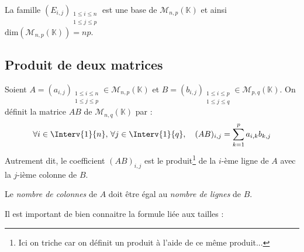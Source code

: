 \documentclass[a4paper,10pt]{report}
\begin{document}
\begin{prop} La famille $(E_{i,j})_{\substack{1 \leq i \leq n \\ 1 \leq j \leq p}}$ est une base de $\mathcal{M}_{n,p}(\mathbb{K})$ et ainsi $\textrm{dim}(\mathcal{M}_{n,p}(\mathbb{K}))=np$.
\end{prop}


\subsection{Produit de deux matrices}

\noindent Soient $A=(a_{i,j})_{\substack{1 \leq i \leq n \\ 1 \leq j \leq p}} \in \mathcal{M}_{n,p}(\mathbb{K})$ et $B=(b_{i,j})_{\substack{1 \leq i \leq p \\ 1 \leq j \leq q}} \in \mathcal{M}_{p,q}(\mathbb{K})$. On définit la matrice $AB$ de $\mathcal{M}_{n,q}(\mathbb{K})$ par :
$$ \forall i \in \Interv{1}{n}, \, \forall j \in \Interv{1}{q}, \quad (AB)_{i,j} = \sum_{k=1}^p a_{i,k} b_{k,j}$$
Autrement dit, le coefficient $(AB)_{i,j}$ est le produit\footnote{Ici on triche car on définit un produit à l'aide de ce même produit... } de la $i$-ème ligne de $A$ avec la $j$-ième colonne de $B$.

\medskip

\begin{rems}
 \item Le \textit{nombre de colonnes} de $A$ doit être égal au \textit{nombre de lignes} de $B$.
\item Il est important de bien connaitre la formule liée aux tailles : 


\begin{center}
\end{center}
\end{rems}
\end{document}
